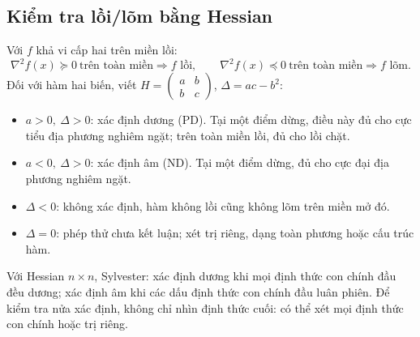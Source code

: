 \documentclass[11pt,a4paper]{article}
\newcommand{\Hess}{\nabla^2}
\begin{document}
\subsection{Kiểm tra lồi/lõm bằng Hessian}
Với \(f\) khả vi cấp hai trên miền lồi:
\[
\Hess f(x)\succeq0\ \text{trên toàn miền}\Rightarrow f\text{ lồi},\qquad
\Hess f(x)\preceq0\ \text{trên toàn miền}\Rightarrow f\text{ lõm}.
\]
Đối với hàm hai biến, viết \(H=\begin{pmatrix}a&b\\b&c\end{pmatrix}\), \(\Delta=ac-b^2\):
\begin{itemize}
\item \(a>0,\ \Delta>0\): xác định dương (PD). Tại một điểm dừng, điều này đủ cho cực tiểu địa phương nghiêm ngặt; trên toàn miền lồi, đủ cho lồi chặt.
\item \(a<0,\ \Delta>0\): xác định âm (ND). Tại một điểm dừng, đủ cho cực đại địa phương nghiêm ngặt.
\item \(\Delta<0\): không xác định, hàm không lồi cũng không lõm trên miền mở đó.
\item \(\Delta=0\): phép thử chưa kết luận; xét trị riêng, dạng toàn phương hoặc cấu trúc hàm.
\end{itemize}
Với Hessian \(n\times n\), Sylvester: xác định dương khi mọi định thức con chính đầu đều dương; xác định âm khi các dấu định thức con chính đầu luân phiên. Để kiểm tra nửa xác định, không chỉ nhìn định thức cuối: có thể xét mọi định thức con chính hoặc trị riêng.

\end{document}
